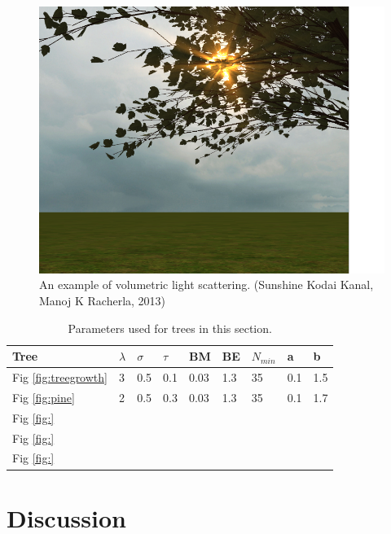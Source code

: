 \documentclass{article}
\begin{document}
  		\begin{figure}[ht!]
  			\includegraphics[scale=0.7]{godrays}
  			\caption{An example of volumetric light scattering. (Sunshine Kodai Kanal, Manoj K Racherla, 2013)}
  			\label{fig:godrayexample}
  		\end{figure}
  	
  		\begin{table} [!h]
  			\begin{center}
  				\caption{Parameters used for trees in this section.}
  				\begin{tabular}{  m{1cm} | P{0.5cm} P{0.5cm} P{0.5cm} P{0.5cm} P{0.5cm} P{0.5cm} P{0.5cm} P{0.5cm} } 
  					\hline
  					Tree & $\lambda$ & $\sigma$ & $\tau$ & BM & BE & $N_{min}$ & a & b \\
  					\hline
  					Fig \ref{fig:treegrowth} & 3 & 0.5 & 0.1 & 0.03 & 1.3 & 35 & 0.1 & 1.5 \\ 
  					Fig \ref{fig:pine}       & 2 & 0.5 & 0.3 & 0.03 & 1.3 & 35 & 0.1 & 1.7 \\ 
  					Fig \ref{fig:} & & & & & & \\ 
  					Fig \ref{fig:} & & & & & & \\ 
  					Fig \ref{fig:} & & & & & & \\ 
  					\hline
  				\end{tabular}
  				\label{table:usedparam}
  			\end{center}
  		\end{table}
  		
  	\section{Discussion}
  		
\end{document}
